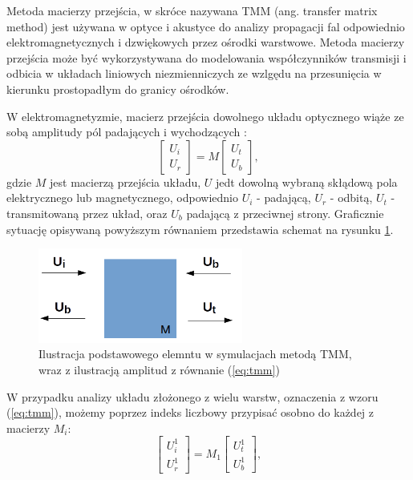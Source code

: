 Metoda macierzy przejścia, w skróce nazywana TMM (ang. transfer matrix method) jest używana w optyce i akustyce do analizy propagacji fal odpowiednio elektromagnetycznych i dzwiękowych przez ośrodki warstwowe. Metoda macierzy przejścia może być wykorzystywana do modelowania współczynników transmisji i odbicia w układach liniowych niezmienniczych ze wzlgędu na przesunięcia w kierunku prostopadłym do granicy ośrodków.

W elektromagnetyzmie, macierz przejścia dowolnego układu optycznego wiąże ze sobą amplitudy pól padających i wychodzących \cite{teich1991fundamentals,markos2008wave}:
\begin{equation}
\begin{bmatrix}
U_i \\ 
U_r
\end{bmatrix}
= M 
\begin{bmatrix}
U_t \\
U_b
\end{bmatrix},
\label{eq:tmm}
\end{equation}
gdzie $M$ jest macierzą przejścia układu, $U$ jedt dowolną wybraną skłądową pola elektrycznego lub magnetycznego, odpowiednio $U_i$ - padającą, $U_r$ - odbitą, $U_t$ - transmitowaną przez układ, oraz $U_b$ padającą  z przeciwnej strony. Graficznie sytuację opisywaną powyższym równaniem przedstawia schemat na rysunku \ref{fig:tmm-simple}.

\begin{figure}
	\includegraphics[width=0.6\textwidth]{images/tmm.png}
	\caption{Ilustracja podstawowego elemntu w symulacjach metodą TMM, wraz z ilustracją amplitud z równanie (\ref{eq:tmm}) }
	\label{fig:tmm-simple}
\end{figure}

W przypadku analizy układu złożonego z wielu warstw, oznaczenia z wzoru (\ref{eq:tmm}), możemy poprzez indeks liczbowy przypisać osobno do każdej z macierzy $M_i$:
\begin{equation}
\begin{bmatrix}
U_i^1 \\ 
U_r^1
\end{bmatrix}
= M_1 
\begin{bmatrix}
U_t^1 \\
U_b^1
\end{bmatrix},
\label{eq:tmm-1l}
\end{equation}

